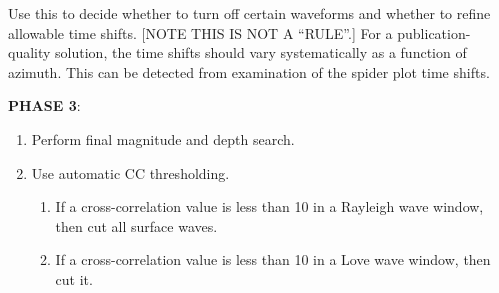 \begin{enumerate}
\begin{enumerate}
Use this to decide whether to turn off certain waveforms and whether to refine allowable time shifts. [NOTE THIS IS NOT A ``RULE''.] For a publication-quality solution, the time shifts should vary systematically as a function of azimuth. This can be detected from examination of the spider plot time shifts.
\end{enumerate}

\medskip\noindent
{\bf PHASE 3}:

\begin{enumerate}
\item Perform final magnitude and depth search.

\item Use automatic CC thresholding.
\begin{enumerate}
\item If a cross-correlation value is less than 10 in a Rayleigh wave window, then cut all surface waves.
\item If a cross-correlation value is less than 10 in a Love wave window, then cut it.
\end{enumerate}

\end{enumerate}


\end{enumerate}

%
%

